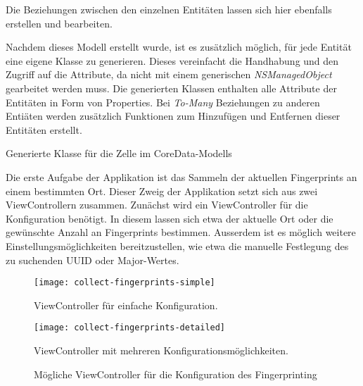 Die Beziehungen zwischen den einzelnen Entitäten lassen sich hier ebenfalls erstellen und bearbeiten. 

Nachdem dieses Modell erstellt wurde, ist es zusätzlich möglich, für jede Entität eine eigene Klasse zu generieren. Dieses vereinfacht die Handhabung und den Zugriff auf die Attribute, da nicht mit einem generischen \emph{NSManagedObject} gearbeitet werden muss. Die generierten Klassen enthalten alle Attribute der Entitäten in Form von Properties. Bei \emph{To-Many} Beziehungen zu anderen Entiäten werden zusätzlich Funktionen zum Hinzufügen und Entfernen dieser Entitäten erstellt.

\begin{listing}[htb!]
	\caption{Generierte Klasse für die Zelle im CoreData-Modells}
	\label{lst:cell_objc}
\end{listing}
  

Die erste Aufgabe der Applikation ist das Sammeln der aktuellen Fingerprints an einem bestimmten Ort. Dieser Zweig der Applikation setzt sich aus zwei ViewControllern zusammen. Zunächst wird ein ViewController für die Konfiguration benötigt. In diesem lassen sich etwa der aktuelle Ort oder die gewünschte Anzahl an Fingerprints bestimmen. Ausserdem ist es möglich weitere Einstellungsmöglichkeiten bereitzustellen, wie etwa die manuelle Festlegung des zu suchenden UUID oder Major-Wertes. 

\begin{figure}[h!]
	\centering
	\begin{minipage}[t]{5cm}
		\texttt{[image: collect-fingerprints-simple]}
		\caption{ViewController für einfache Konfiguration.}
		\label{collect-fingerprints-simple}
	\end{minipage}
	\hspace{2cm}
	\begin{minipage}[t]{5cm}
			\texttt{[image: collect-fingerprints-detailed]}
			\caption{ViewController mit mehreren Konfigurationsmöglichkeiten.}
			\label{collect-fingerprints-detailed}
	\end{minipage}
		\caption{Mögliche ViewController für die Konfiguration des Fingerprinting}
		\label{collect-fingerprints}
\end{figure}

